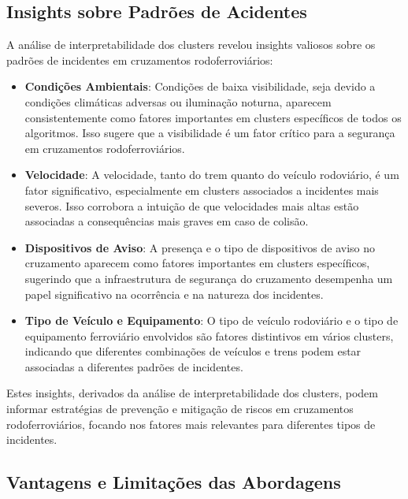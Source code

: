 \documentclass[conference]{IEEEtran}
\begin{document}
\subsection{Insights sobre Padrões de Acidentes}
A análise de interpretabilidade dos clusters revelou insights valiosos sobre os padrões de incidentes em cruzamentos rodoferroviários:

\begin{itemize}
    \item \textbf{Condições Ambientais}: Condições de baixa visibilidade, seja devido a condições climáticas adversas ou iluminação noturna, aparecem consistentemente como fatores importantes em clusters específicos de todos os algoritmos. Isso sugere que a visibilidade é um fator crítico para a segurança em cruzamentos rodoferroviários.
    
    \item \textbf{Velocidade}: A velocidade, tanto do trem quanto do veículo rodoviário, é um fator significativo, especialmente em clusters associados a incidentes mais severos. Isso corrobora a intuição de que velocidades mais altas estão associadas a consequências mais graves em caso de colisão.
    
    \item \textbf{Dispositivos de Aviso}: A presença e o tipo de dispositivos de aviso no cruzamento aparecem como fatores importantes em clusters específicos, sugerindo que a infraestrutura de segurança do cruzamento desempenha um papel significativo na ocorrência e na natureza dos incidentes.
    
    \item \textbf{Tipo de Veículo e Equipamento}: O tipo de veículo rodoviário e o tipo de equipamento ferroviário envolvidos são fatores distintivos em vários clusters, indicando que diferentes combinações de veículos e trens podem estar associadas a diferentes padrões de incidentes.
\end{itemize}

Estes insights, derivados da análise de interpretabilidade dos clusters, podem informar estratégias de prevenção e mitigação de riscos em cruzamentos rodoferroviários, focando nos fatores mais relevantes para diferentes tipos de incidentes.

\subsection{Vantagens e Limitações das Abordagens}
\end{document}
